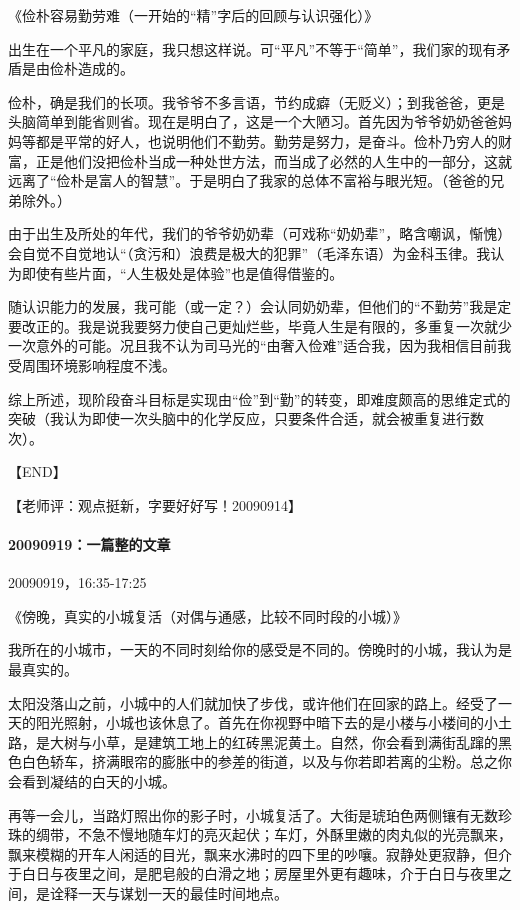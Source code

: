 \documentclass[UTF8]{book}
\begin{document}
《俭朴容易勤劳难（一开始的“精”字后的回顾与认识强化）》

出生在一个平凡的家庭，我只想这样说。可“平凡”不等于“简单”，我们家的现有矛盾是由俭朴造成的。

俭朴，确是我们的长项。我爷爷不多言语，节约成癖（无贬义）；到我爸爸，更是头脑简单到能省则省。现在是明白了，这是一个大陋习。首先因为爷爷奶奶爸爸妈妈等都是平常的好人，也说明他们不勤劳。勤劳是努力，是奋斗。俭朴乃穷人的财富，正是他们没把俭朴当成一种处世方法，而当成了必然的人生中的一部分，这就远离了“俭朴是富人的智慧”。于是明白了我家的总体不富裕与眼光短。（爸爸的兄弟除外。）

由于出生及所处的年代，我们的爷爷奶奶辈（可戏称“奶奶辈”，略含嘲讽，惭愧）会自觉不自觉地认“（贪污和）浪费是极大的犯罪”（毛泽东语）为金科玉律。我认为即使有些片面，“人生极处是体验”也是值得借鉴的。

随认识能力的发展，我可能（或一定？）会认同奶奶辈，但他们的“不勤劳”我是定要改正的。我是说我要努力使自己更灿烂些，毕竟人生是有限的，多重复一次就少一次意外的可能。况且我不认为司马光的“由奢入俭难”适合我，因为我相信目前我受周围环境影响程度不浅。

综上所述，现阶段奋斗目标是实现由“俭”到“勤”的转变，即难度颇高的思维定式的突破（我认为即使一次头脑中的化学反应，只要条件合适，就会被重复进行数次）。

【END】

【老师评：观点挺新，字要好好写！20090914】


\paragraph{20090919：一篇整的文章}

20090919，16:35-17:25

《傍晚，真实的小城复活（对偶与通感，比较不同时段的小城）》

我所在的小城市，一天的不同时刻给你的感受是不同的。傍晚时的小城，我认为是最真实的。

太阳没落山之前，小城中的人们就加快了步伐，或许他们在回家的路上。经受了一天的阳光照射，小城也该休息了。首先在你视野中暗下去的是小楼与小楼间的小土路，是大树与小草，是建筑工地上的红砖黑泥黄土。自然，你会看到满街乱蹿的黑色白色轿车，挤满眼帘的膨胀中的参差的街道，以及与你若即若离的尘粉。总之你会看到凝结的白天的小城。

再等一会儿，当路灯照出你的影子时，小城复活了。大街是琥珀色两侧镶有无数珍珠的绸带，不急不慢地随车灯的亮灭起伏；车灯，外酥里嫩的肉丸似的光亮飘来，飘来模糊的开车人闲适的目光，飘来水沸时的四下里的吵嚷。寂静处更寂静，但介于白日与夜里之间，是肥皂般的白滑之地；房屋里外更有趣味，介于白日与夜里之间，是诠释一天与谋划一天的最佳时间地点。
\end{document}

